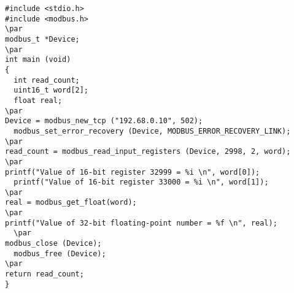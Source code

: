 \documentclass[12pt,a4paper,margin=2cm]{book}
\def\lthtmlcheckvsize{\ifdim\ht\sizebox<\vsize 
  \ifdim\wd\sizebox<\hsize\expandafter\hfill\fi \expandafter\vfill
  \else\expandafter\vss\fi}%
\begin{document}
{\newpage\clearpage
{}%
\begin{lstlisting}
#include <stdio.h>
#include <modbus.h>
\par
modbus_t *Device;
\par
int main (void)
{
  int read_count;
  uint16_t word[2];
  float real;
\par
Device = modbus_new_tcp ("192.68.0.10", 502);
  modbus_set_error_recovery (Device, MODBUS_ERROR_RECOVERY_LINK);
\par
read_count = modbus_read_input_registers (Device, 2998, 2, word);
\par
printf("Value of 16-bit register 32999 = %i \n", word[0]);
  printf("Value of 16-bit register 33000 = %i \n", word[1]);
\par
real = modbus_get_float(word);
\par
printf("Value of 32-bit floating-point number = %f \n", real);
  \par
modbus_close (Device);
  modbus_free (Device);
\par
return read_count;
}
\end{lstlisting}%
\lthtmlfigureZ
\lthtmlcheckvsize\clearpage}

\end{document}
